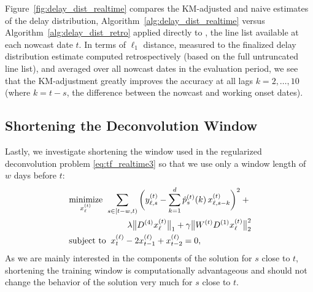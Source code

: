 \documentclass[sts]{imsart}
\newcommand{\minimize}{\mathop{\mathrm{minimize}}}
\newcommand{\subjectto}{\mathop{\mathrm{subject\,\,to}}}
\def\hx{\hat{x}}
\def\hp{\hat{p}}
\def\D{\mathcal{D}}
\theoremstyle{plain}
\theoremstyle{definition}
\theoremstyle{remark}
\begin{document}
Figure~\ref{fig:delay_dist_realtime} compares the KM-adjusted and naive
estimates of the delay distribution, Algorithm~\ref{alg:delay_dist_realtime}
versus Algorithm~\ref{alg:delay_dist_retro} applied directly to
\smash{$\D^{(t)}$}, the line list available at each nowcast date $t$. In terms
of $\ell_1$ distance, measured to the finalized delay distribution estimate
computed retrospectively (based on the full untruncated line list), and averaged
over all  nowcast dates in the evaluation period, we see that the KM-adjustment
greatly improves the accuracy at all lags $k=2,\ldots,10$ (where $k=t-s$, the 
difference between the nowcast and working onset dates). 

\subsection{Shortening the Deconvolution Window}

Lastly, we investigate shortening the window used in the regularized
deconvolution problem \eqref{eq:tf_realtime3} so that we use only a window 
length of $w$ days before $t$:
\begin{equation}
\label{eq:tf_realtime4}
\begin{alignedat}{2}
&\minimize_{x^{(t)}_\ell} \; && \sum_{s \in [t-w, t)} \bigg( y^{(t)}_{\ell,s} - 
\sum_{k=1}^d \hp^{(t)}_s(k) \, x^{(t)}_{\ell, s-k} \bigg)^2 +{} \\  
& && \hspace{25pt} \hfill
\lambda \big\|D^{(4)} x^{(t)}_\ell \big\|_1 +
\gamma \big\|W^{(t)} D^{(1)} x^{(t)}_\ell \big\|_2^2 \\ 
&\subjectto && \;\; x^{(\ell)}_t - 2x^{(\ell)}_{t-1} + x^{(\ell)}_{t-2} = 0, 
\end{alignedat}
\end{equation}
As we are mainly interested in the components of the solution
\smash{$\hx^{(t)}_s$} for $s$ close to $t$, shortening the training window is
computationally advantageous and should not change the behavior of the solution
very much for $s$ close to $t$.
\end{document}
